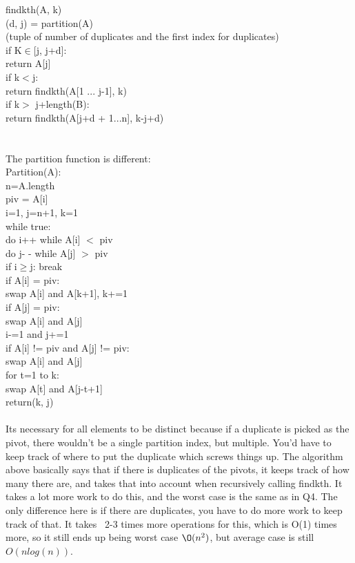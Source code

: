 \documentclass[10pt,a4paper]{article}
\newcommand\tab[1][1cm]{\hspace*{#1}}
\begin{document}
	findkth(A, k) { \\
	\tab (d, j) = partition(A) \\ (tuple of number of duplicates and the first index for duplicates) \\
	\tab if K$\in$[j, j+d]: \\
	\tab \tab return A[j] \\
	\tab if k$<$j: \\
	\tab \tab return findkth(A[1 ... j-1], k) \\
	\tab if k$>$ j+length(B): \\
	\tab \tab return findkth(A[j+d + 1...n], k-j+d) \\
	\\
	\\
	The partition function is different: \\
	Partition(A): \\
	n=A.length \\
	piv = A[i] \\
	i=1, j=n+1, k=1 \\
	while true: \\
	\tab do i++ while A[i] $<$ piv \\
	\tab do j- - while A[j] $>$ piv \\
	\tab if i$\geq$j: break \\
	\tab if A[i] = piv: \\
	\tab \tab swap A[i] and A[k+1], k+=1 \\
	\tab if A[j] = piv: \\
	\tab \tab swap A[i] and A[j]\\
	\tab \tab i-=1 and j+=1 \\
	\tab if A[i] != piv and A[j] != piv: \\
	\tab \tab swap A[i] and A[j] \\
	for t=1 to k: \\
	\tab swap A[t] and A[j-t+1] \\
	return(k, j)\\
	}\\
	Its necessary for all elements to be distinct because if a duplicate is picked as the pivot, there wouldn't be a single partition index, but multiple. You'd have to keep track of where to put the duplicate which screws things up. The algorithm above basically says that if there is duplicates of the pivots, it keeps track of how many there are, and takes that into account when recursively calling findkth. It takes a lot more work to do this, and the worst case is the same as in Q4. The only difference here is if there are duplicates, you have to do more work to keep track of that. It takes ~2-3 times more operations for this, which is O(1) times more, so it still ends up being worst case $\O(n^2)$, but average case is still $O(nlog(n))$.
\end{document}

